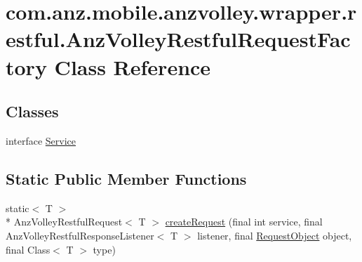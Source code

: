 \hypertarget{classcom_1_1anz_1_1mobile_1_1anzvolley_1_1wrapper_1_1restful_1_1_anz_volley_restful_request_factory}{\section{com.\+anz.\+mobile.\+anzvolley.\+wrapper.\+restful.\+Anz\+Volley\+Restful\+Request\+Factory Class Reference}
\label{classcom_1_1anz_1_1mobile_1_1anzvolley_1_1wrapper_1_1restful_1_1_anz_volley_restful_request_factory}
}
\subsection*{Classes}
\begin{DoxyCompactItemize}
\item 
interface \hyperlink{interfacecom_1_1anz_1_1mobile_1_1anzvolley_1_1wrapper_1_1restful_1_1_anz_volley_restful_request_factory_1_1_service}{Service}
\end{DoxyCompactItemize}
\subsection*{Static Public Member Functions}
\begin{DoxyCompactItemize}
\item 
static$<$ T $>$\\*
 Anz\+Volley\+Restful\+Request$<$ T $>$ \hyperlink{classcom_1_1anz_1_1mobile_1_1anzvolley_1_1wrapper_1_1restful_1_1_anz_volley_restful_request_factory_a5aed8fb22ed5137a4661d7ebb407e094}{create\+Request} (final int service, final Anz\+Volley\+Restful\+Response\+Listener$<$ T $>$ listener, final \hyperlink{classcom_1_1anz_1_1mobile_1_1anzvolley_1_1wrapper_1_1json_1_1_request_object}{Request\+Object} object, final Class$<$ T $>$ type)
\end{DoxyCompactItemize}


